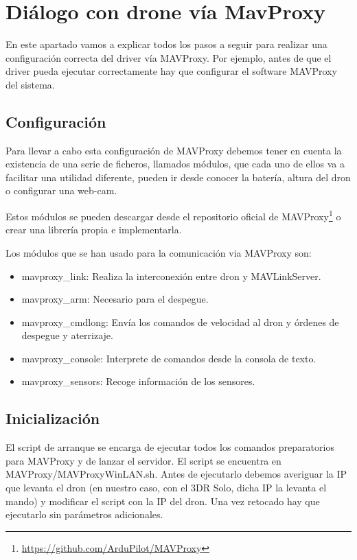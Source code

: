 \section{Diálogo con drone vía MavProxy}
En este apartado vamos a explicar todos los pasos a seguir para realizar una configuración correcta del driver vía MAVProxy. Por ejemplo, antes de que el driver pueda ejecutar correctamente hay que configurar el software MAVProxy del sistema.

\subsection{Configuración}
\label{Pre-Configuracion}
Para llevar a cabo esta configuración de MAVProxy debemos tener en cuenta la existencia de una serie de ficheros, llamados módulos, que cada uno de ellos va a facilitar una utilidad diferente, pueden ir desde conocer la batería, altura del dron o configurar una web-cam.

Estos módulos se pueden descargar desde el repositorio oficial de MAVProxy\footnote{\url{https://github.com/ArduPilot/MAVProxy}} o crear una librería propia e implementarla.

Los módulos que se han usado para la comunicación via MAVProxy son: 

\begin{itemize}
\item mavproxy\_link: Realiza la interconexión entre dron y MAVLinkServer.
\item mavproxy\_arm: Necesario para el despegue.
\item mavproxy\_cmdlong: Envía los comandos de velocidad al dron y órdenes de despegue y aterrizaje.
\item mavproxy\_console: Interprete de comandos desde la consola de texto.
\item mavproxy\_sensors: Recoge información de los sensores.
\end{itemize}

\subsection{Inicialización}
El script de arranque se encarga de ejecutar todos los comandos preparatorios para MAVProxy y de lanzar el servidor. El script se encuentra en MAVProxy/MAVProxyWinLAN.sh. Antes de ejecutarlo debemos averiguar la IP que levanta el dron (en nuestro caso, con el 3DR Solo, dicha IP la levanta el mando) y modificar el script con la IP del dron. Una vez retocado hay que ejecutarlo sin parámetros adicionales. 

